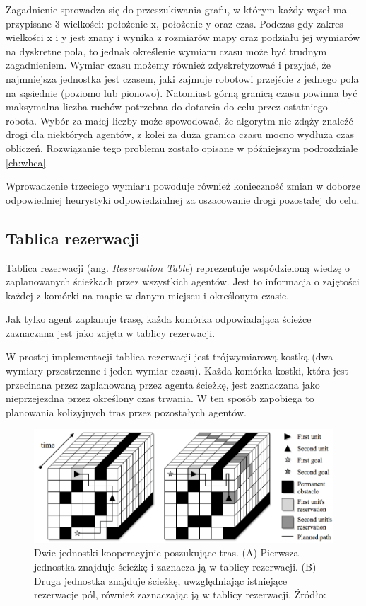 Zagadnienie sprowadza się do przeszukiwania grafu, w którym każdy węzeł ma przypisane 3 wielkości: położenie x, położenie y oraz czas.
Podczas gdy zakres wielkości x i y jest znany i wynika z rozmiarów mapy oraz podziału jej wymiarów na dyskretne pola, to jednak określenie wymiaru czasu może być trudnym zagadnieniem.
Wymiar czasu możemy również zdyskretyzować i przyjać, że najmniejsza jednostka jest czasem, jaki zajmuje robotowi przejście z jednego pola na sąsiednie (poziomo lub pionowo). Natomiast górną granicą czasu powinna być maksymalna liczba ruchów potrzebna do dotarcia do celu przez ostatniego robota. Wybór za małej liczby może spowodować, że algorytm nie zdąży znaleźć drogi dla niektórych agentów, z kolei za duża granica czasu mocno wydłuża czas obliczeń. Rozwiązanie tego problemu zostało opisane w późniejszym podrozdziale \ref{ch:whca}.

Wprowadzenie trzeciego wymiaru powoduje również konieczność zmian w doborze odpowiedniej heurystyki odpowiedzialnej za oszacowanie drogi pozostałej do celu.

\subsection{Tablica rezerwacji}
Tablica rezerwacji (ang. {\it Reservation Table}) reprezentuje wspódzieloną wiedzę o zaplanowanych ścieżkach przez wszystkich agentów.
Jest to informacja o zajętości każdej z komórki na mapie w danym miejscu i określonym czasie. \cite{cooppath}

Jak tylko agent zaplanuje trasę, każda komórka odpowiadająca ścieżce zaznaczana jest jako zajęta w tablicy rezerwacji.

W prostej implementacji tablica rezerwacji jest trójwymiarową kostką (dwa wymiary przestrzenne i jeden wymiar czasu).
Każda komórka kostki, która jest przecinana przez zaplanowaną przez agenta ścieżkę, jest zaznaczana jako nieprzejezdna przez określony czas trwania. W ten sposób zapobiega to planowania kolizyjnych tras przez pozostałych agentów.

\begin{figure}
	\centering
	\includegraphics[width=13cm]{img/reservation-table}
	\caption{Dwie jednostki kooperacyjnie poszukujące tras. (A) Pierwsza jednostka znajduje ścieżkę i zaznacza ją w tablicy rezerwacji. (B) Druga jednostka znajduje ścieżkę, uwzględniając istniejące rezerwacje pól, również zaznaczając ją w tablicy rezerwacji. Źródło: \cite{cooppath}}
	\label{fig:img_reservation-table}
\end{figure}

